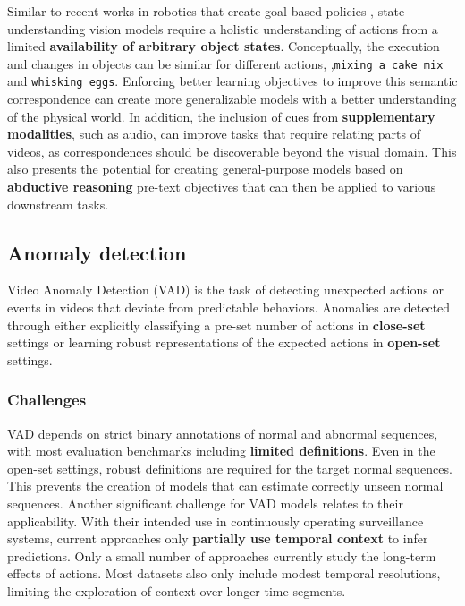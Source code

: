 Similar to recent works in robotics that create goal-based policies \citep{kununi2024uni,wang2023manipulate}, state-understanding vision models require a holistic understanding of actions from a limited \textbf{availability of arbitrary object states}. Conceptually, the execution and changes in objects can be similar for different actions, \eg,\texttt{mixing a cake mix} and \texttt{whisking eggs}. Enforcing better learning objectives to improve this semantic correspondence can create more generalizable models with a better understanding of the physical world. In addition, the inclusion of cues from \textbf{supplementary modalities}, such as audio, can improve tasks that require relating parts of videos, as correspondences should be discoverable beyond the visual domain. This also presents the potential for creating general-purpose models based on \textbf{abductive reasoning} pre-text objectives that can then be applied to various downstream tasks.



\subsection{Anomaly detection}

Video Anomaly Detection (VAD) is the task of detecting unexpected actions or events in videos that deviate from predictable behaviors. Anomalies are detected through either explicitly classifying a pre-set number of actions in \textbf{close-set} settings or learning robust representations of the expected actions in \textbf{open-set} settings.


\subsubsection{Challenges}

VAD depends on strict binary annotations of normal and abnormal sequences, with most evaluation benchmarks including \textbf{limited definitions}. Even in the open-set settings, robust definitions are required for the target normal sequences. This prevents the creation of models that can estimate correctly unseen normal sequences. Another significant challenge for VAD models relates to their applicability. With their intended use in continuously operating surveillance systems, current approaches only \textbf{partially use temporal context} to infer predictions. Only a small number of approaches currently study the long-term effects of actions. Most datasets also only include modest temporal resolutions, limiting the exploration of context over longer time segments.



